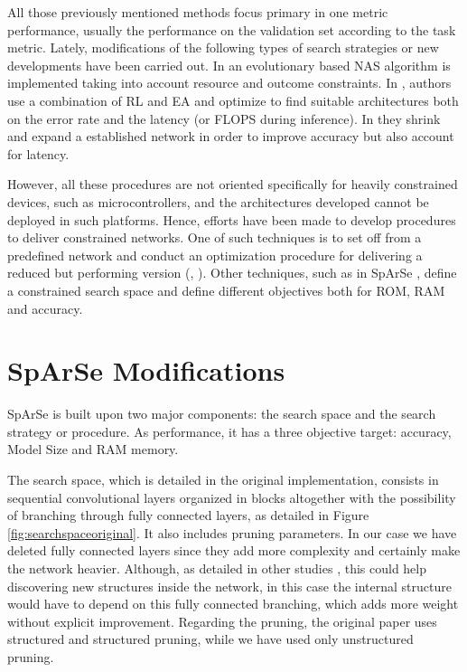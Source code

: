 \documentclass[10pt, a4paper, twocolumn]{article}
\begin{document}
All those previously mentioned methods focus primary in one metric performance, usually the performance on the validation set according to the task metric. Lately, modifications of the following types of search strategies or new developments have been carried out. In \cite{Elsken2018} an evolutionary based NAS algorithm is implemented taking into account resource and outcome constraints. In \cite{Chu2019}, authors use a combination of RL and EA and optimize to find suitable architectures both on the error rate and the latency (or FLOPS during inference). In \cite{Gordon2017} they shrink and expand a established network in order to improve accuracy but also account for latency.

However, all these procedures are not oriented specifically for heavily constrained devices, such as microcontrollers, and the architectures developed cannot be deployed in such platforms. Hence, efforts have been made to develop procedures to deliver constrained networks. One of such techniques is to set off from a predefined network and conduct an optimization procedure for delivering a reduced but performing version (\cite{Loni2020}, \cite{Cai2019f}). Other techniques, such as in SpArSe \cite{Fedorov2019}, define a constrained search space and define different objectives both for ROM, RAM and accuracy.


\section{SpArSe Modifications}\label{Sparsemod}

SpArSe is built upon two major components: the search space and the search strategy or procedure. As performance, it has a three objective target: accuracy, Model Size and RAM memory.

The search space, which is detailed in the original implementation, consists in sequential convolutional layers organized in blocks altogether with the possibility of branching through fully connected layers, as detailed in Figure \ref{fig:searchspaceoriginal}. It also includes pruning parameters. In our case we have deleted fully connected layers since they add more complexity and certainly make the network heavier. Although, as detailed in other studies \cite{Frankle2019}, this could help discovering new structures inside the network, in this case the internal structure would have to depend on this fully connected branching, which adds more weight without explicit improvement. Regarding the pruning, the original paper uses structured and structured pruning, while we have used only unstructured pruning.
\end{document}

